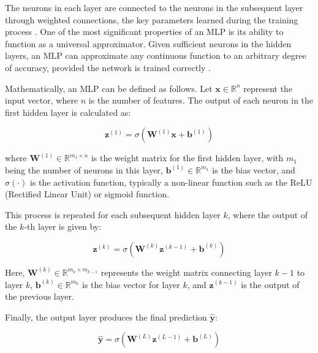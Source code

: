 The neurons in each layer are connected to the neurons in the subsequent layer through weighted connections, the key parameters learned during the training process \cite{Hippert_Pedreira_Souza_2001}. One of the most significant properties of an MLP is its ability to function as a universal approximator. Given sufficient neurons in the hidden layers, an MLP can approximate any continuous function to an arbitrary degree of accuracy, provided the network is trained correctly \cite{Zhang_Eddy_Patuwo_Y_Hu_1998}.

Mathematically, an MLP can be defined as follows. Let $\mathbf{x} \in \mathbb{R}^n$ represent the input vector, where $n$ is the number of features. The output of each neuron in the first hidden layer is calculated as:

\begin{equation}
 \mathbf{z}^{(1)} = \sigma\left(\mathbf{W}^{(1)}\mathbf{x} + \mathbf{b}^{(1)}\right)   
    \label{eq:output_neuron}
\end{equation}



where $\mathbf{W}^{(1)} \in \mathbb{R}^{m_1 \times n}$ is the weight matrix for the first hidden layer, with $m_1$ being the number of neurons in this layer, $\mathbf{b}^{(1)} \in \mathbb{R}^{m_1}$ is the bias vector, and $\sigma(\cdot)$ is the activation function, typically a non-linear function such as the ReLU (Rectified Linear Unit) or sigmoid function.

This process is repeated for each subsequent hidden layer $k$, where the output of the $k$-th layer is given by:

\begin{equation}
 \mathbf{z}^{(k)} = \sigma\left(\mathbf{W}^{(k)}\mathbf{z}^{(k-1)} + \mathbf{b}^{(k)}\right) 
    \label{eq:hidden_layers_output}
\end{equation}


Here, $\mathbf{W}^{(k)} \in \mathbb{R}^{m_k \times m_{k-1}}$ represents the weight matrix connecting layer $k-1$ to layer $k$, $\mathbf{b}^{(k)} \in \mathbb{R}^{m_k}$ is the bias vector for layer $k$, and $\mathbf{z}^{(k-1)}$ is the output of the previous layer.

Finally, the output layer produces the final prediction $\mathbf{\hat{y}}$:

\begin{equation}
 \mathbf{\hat{y}} = \sigma\left(\mathbf{W}^{(L)}\mathbf{z}^{(L-1)} + \mathbf{b}^{(L)}\right)   
    \label{eq:output_layer}
\end{equation}

